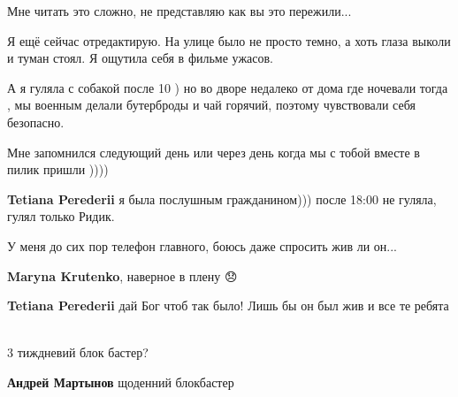  
 
 
 
 

\qqSecCmt


Мне читать это сложно, не представляю как вы это пережили...


Я ещё сейчас отредактирую. На улице было не просто темно, а хоть глаза выколи и
туман стоял. Я ощутила себя в фильме ужасов.


А я гуляла с собакой после 10 ) но во дворе недалеко от дома где ночевали тогда
, мы военным делали бутерброды и чай горячий, поэтому чувствовали себя
безопасно.

Мне запомнился следующий день или через день когда мы с тобой вместе в пилик
пришли ))))

\begin{itemize} %
\textbf{Tetiana Perederii} я была послушным гражданином))) после 18:00 не гуляла, гулял только Ридик.
\end{itemize} %


У меня до сих пор телефон главного, боюсь даже спросить жив ли он...

\begin{itemize} %
\textbf{Maryna Krutenko}, наверное в плену 😞

\textbf{Tetiana Perederii} дай Бог чтоб так было! Лишь бы он был жив и все те ребята 🙏🙏🙏
\end{itemize} %


3 тиждневий блок бастер?

\begin{itemize} %
\textbf{Андрей Мартынов} щоденний блокбастер
\end{itemize} %
